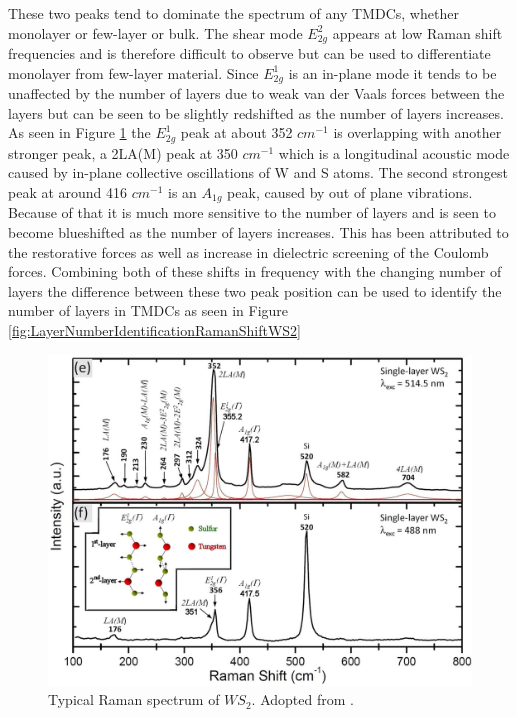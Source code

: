 These two peaks tend to dominate the spectrum of any TMDCs, whether monolayer or few-layer or bulk. The shear mode $E^2_{2g}$ appears at low Raman shift frequencies and is therefore difficult to observe but can be used to differentiate monolayer from few-layer material. Since $E^1_{2g}$ is an in-plane mode it tends to be unaffected by the number of layers due to weak van der Vaals forces between the layers but can be seen to be slightly redshifted as the number of layers increases. As seen in Figure \ref{fig:TypicalRamanSpectrumWS2} the $E^1_{2g}$ peak at about 352 $cm^{-1}$ is overlapping with another stronger peak, a 2LA(M) peak at 350 $cm^{-1}$ which is a longitudinal acoustic mode caused by in-plane collective oscillations of W and S atoms. The second strongest peak at around 416 $cm^{-1}$ is an $A_{1g}$ peak, caused by out of plane vibrations. Because of that it is much more sensitive to the number of layers and is seen to become blueshifted as the number of layers increases. This has been attributed to the restorative forces as well as increase in dielectric screening of the Coulomb forces. Combining both of these shifts in frequency with the changing number of layers the difference between these two peak position can be used to identify the number of layers in TMDCs as seen in Figure \ref{fig:LayerNumberIdentificationRamanShiftWS2}
	
\begin{figure}[h]
	\begin{center}
		\includegraphics[scale=0.3]{RamanPeaksIdentification.png}
		\caption{Typical Raman spectrum of $WS_2$. Adopted from \cite{Berkdemir2013}.}
		\label{fig:TypicalRamanSpectrumWS2}
	\end{center}
\end{figure}
	
